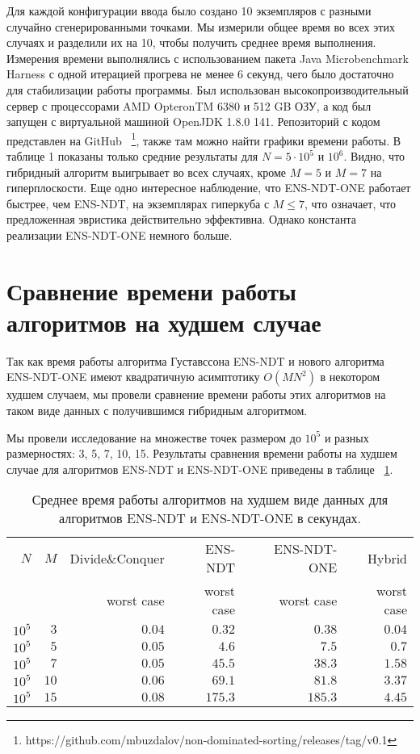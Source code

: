 Для каждой конфигурации ввода было создано 10 экземпляров с разными случайно сгенерированными точками. Мы измерили общее время во всех этих случаях и разделили их на 10, чтобы получить среднее время выполнения. Измерения времени выполнялись с использованием пакета Java Microbenchmark Harness с одной итерацией прогрева не менее 6 секунд, чего было достаточно для стабилизации работы программы. Был использован высокопроизводительный сервер с процессорами AMD OpteronTM 6380 и 512 GB ОЗУ, а код был запущен с виртуальной машиной OpenJDK 1.8.0 141.
Репозиторий с кодом представлен на GitHub ~\footnote{https://github.com/mbuzdalov/non-dominated-sorting/releases/tag/v0.1}, также там можно найти графики времени работы. В таблице 1 показаны только средние результаты для $ N = 5 \cdot 10 ^ 5 $ и $ 10 ^ 6 $. Видно, что гибридный алгоритм выигрывает во всех случаях, кроме $ M = 5 $ и $ M = 7 $ на гиперплоскости. Еще одно интересное наблюдение, что ENS-NDT-ONE работает быстрее, чем ENS-NDT, на экземплярах гиперкуба с $ M \leq 7 $, что означает, что предложенная эвристика действительно эффективна. Однако константа реализации ENS-NDT-ONE немного больше.

\section{Сравнение времени работы алгоритмов на худшем случае}

Так как время работы алгоритма Густавссона ENS-NDT и нового алгоритма ENS-NDT-ONE имеют квадратичную асимптотику $O(MN^2)$ в некотором худшем случаем, мы провели сравнение времени работы этих алгоритмов на таком виде данных с получившимся гибридным алгоритмом. 

Мы провели исследование на множестве точек размером до $10^5$ и разных размерностях: 3, 5, 7, 10, 15. Результаты сравнения времени работы на худшем случае для алгоритмов ENS-NDT и ENS-NDT-ONE приведены в таблице ~\ref{results_worst_case}.

\begin{table}[!ht]
\caption{Среднее время работы алгоритмов на худшем виде данных для алгоритмов ENS-NDT и ENS-NDT-ONE в секундах.}
\label{results_worst_case}
\begin{tabular}{rr|r|r|r|r}
$N$&$M$ & {Divide\&Conquer} 
        & {ENS-NDT} 
        & {ENS-NDT-ONE} 
        & {Hybrid} \\
& & {\scriptsize worst case} 
  & {\scriptsize worst case} 
  & {\scriptsize worst case} 
  & {\scriptsize worst case} \\\hline
      $10^5$&$3$  & $0.04$& $0.32$ & $0.38$ & $0.04$\\\hline
      $10^5$&$5$  & $0.05$& $4.6$ & $7.5$ & $0.7$\\\hline
      $10^5$&$7$  & $0.05$& $45.5$ & $38.3$ & $1.58$\\\hline
      $10^5$&$10$ & $0.06$& $69.1$ & $81.8$ & $3.37$\\\hline
      $10^5$&$15$ & $0.08$& $175.3$ & $185.3$ & $4.45$\\\hline
\end{tabular}
\end{table}

